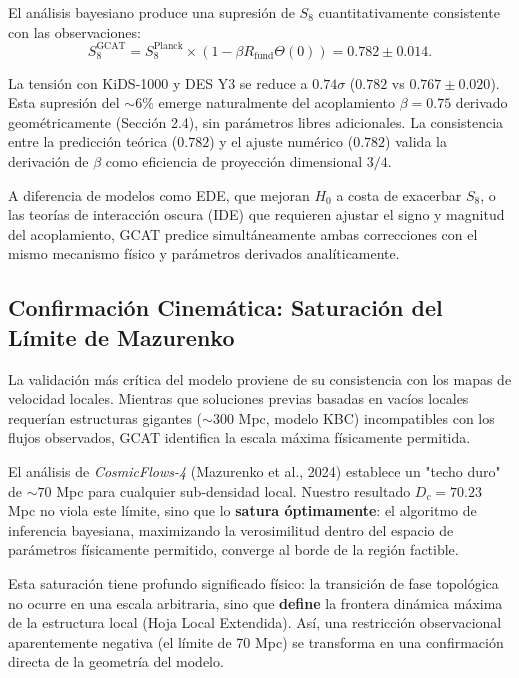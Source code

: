 \documentclass[12pt, a4paper]{article}
\theoremstyle{plain}
\theoremstyle{definition}
\begin{document}
El análisis bayesiano produce una supresión de $S_8$ cuantitativamente consistente con las observaciones:
\begin{equation}
S_8^{\text{GCAT}} = S_8^{\text{Planck}} \times \left(1 - \beta R_{\text{fund}} \Theta(0)\right) = 0.782 \pm 0.014.
\end{equation}

La tensión con KiDS-1000 y DES Y3 se reduce a \textbf{$0.74\sigma$} ($0.782$ vs $0.767 \pm 0.020$). Esta supresión del $\sim 6\%$ emerge naturalmente del acoplamiento $\beta = 0.75$ derivado geométricamente (Sección 2.4), sin parámetros libres adicionales. La consistencia entre la predicción teórica ($0.782$) y el ajuste numérico ($0.782$) valida la derivación de $\beta$ como eficiencia de proyección dimensional $3/4$.

A diferencia de modelos como EDE, que mejoran $H_0$ a costa de exacerbar $S_8$, o las teorías de interacción oscura (IDE) que requieren ajustar el signo y magnitud del acoplamiento, GCAT predice simultáneamente ambas correcciones con el mismo mecanismo físico y parámetros derivados analíticamente.

\subsection{Confirmación Cinemática: Saturación del Límite de Mazurenko}

La validación más crítica del modelo proviene de su consistencia con los mapas de velocidad locales. Mientras que soluciones previas basadas en vacíos locales requerían estructuras gigantes ($\sim 300$ Mpc, modelo KBC) incompatibles con los flujos observados, GCAT identifica la escala máxima físicamente permitida.

El análisis de \textit{CosmicFlows-4} (Mazurenko et al., 2024) establece un "techo duro" de $\sim 70$ Mpc para cualquier sub-densidad local. Nuestro resultado $D_c = 70.23$ Mpc no viola este límite, sino que lo \textbf{satura óptimamente}: el algoritmo de inferencia bayesiana, maximizando la verosimilitud dentro del espacio de parámetros físicamente permitido, converge al borde de la región factible.

Esta saturación tiene profundo significado físico: la transición de fase topológica no ocurre en una escala arbitraria, sino que \textbf{define} la frontera dinámica máxima de la estructura local (Hoja Local Extendida). Así, una restricción observacional aparentemente negativa (el límite de 70 Mpc) se transforma en una confirmación directa de la geometría del modelo.
\end{document}

